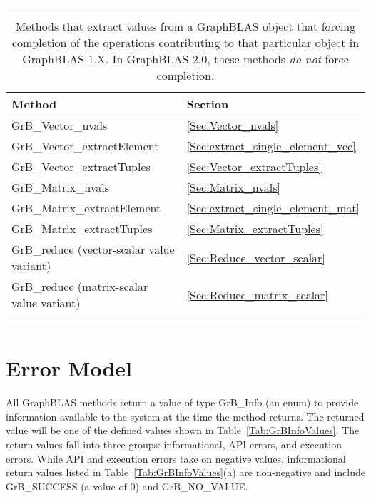 \begin{table}[tbh]
    \hrule
    \begin{center}
        \caption[Methods that forced completion prior to GraphBLAS v2.0.]{Methods that extract values from a GraphBLAS object that 
        forcing completion of the operations contributing to that particular object in GraphBLAS 1.X. 
        In GraphBLAS 2.0, these methods \emph{do not} force completion.}
        \label{Tab:ExtractMethods}

        \begin{tabular}{l|l}
            Method    					& Section 				\\ \hline

            {\sf GrB\_Vector\_nvals}        		& \ref{Sec:Vector_nvals}        	\\
            {\sf GrB\_Vector\_extractElement}     	& \ref{Sec:extract_single_element_vec}  \\
            {\sf GrB\_Vector\_extractTuples}    	& \ref{Sec:Vector_extractTuples}    	\\
            {\sf GrB\_Matrix\_nvals}        		& \ref{Sec:Matrix_nvals}        	\\
            {\sf GrB\_Matrix\_extractElement}     	& \ref{Sec:extract_single_element_mat}  \\
            {\sf GrB\_Matrix\_extractTuples}    	& \ref{Sec:Matrix_extractTuples}    	\\
            {\sf GrB\_reduce} (vector-scalar value variant)   & \ref{Sec:Reduce_vector_scalar}        \\
            {\sf GrB\_reduce} (matrix-scalar value variant)   & \ref{Sec:Reduce_matrix_scalar}        \\
        \end{tabular}
    \end{center}
    \hrule
\end{table}




\section{Error Model}
\label{Sec:ErrorModel}


All GraphBLAS methods return a value of type {\sf GrB\_Info} (an enum) to 
provide information available to the system at the time the method returns. 
The returned value will be one of the defined values shown in 
Table~\ref{Tab:GrBInfoValues}. The return values fall into three groups: 
informational, API errors, and execution errors.  While API and execution 
errors take on negative values, informational return values listed in  
Table~\ref{Tab:GrBInfoValues}(a) are non-negative and include 
{\sf GrB\_SUCCESS} (a value of 0) and {\sf GrB\_NO\_VALUE}.  

